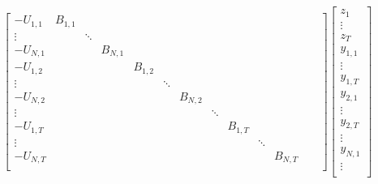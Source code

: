 \documentclass[11pt]{article} %
\begin{document}
\begin{align}  
    \begin{bmatrix}
        -U_{1,1} & B_{1,1} &         &         &         &         &         &         &         &         &         &         &\\
        \vdots  &         & \ddots  &         &         &         &         &         &         &         &         &         &\\
        -U_{N,1} &         &         & B_{N,1} &         &         &         &         &         &         &         &         &\\
        -U_{1,2} &         &         &         & B_{1,2} &         &         &         &         &         &         &         &\\
        \vdots  &         &         &         &          &  \ddots &        &         &         &         &         &         &\\
        -U_{N,2}&         &         &         &         &         & B_{N,2}  &        &         &         &         &         &\\
        \vdots  &         &         &         &         &         &         & \ddots  &         &         &         &         &\\
        -U_{1,T}&         &         &         &         &         &         &         & B_{1,T} &         &          &         &\\
        \vdots  &         &         &         &         &         &         &         &         & \ddots  &         &     &\\
        -U_{N,T}&         &         &         &         &         &         &         &         &         & B_{N,T}  &         & \\
    \end{bmatrix}
    \begin{bmatrix}
        z_{1}\\
        \vdots\\
        z_{T}\\
        y_{1,1}\\
        \vdots \\
        y_{1,T} \\
        y_{2,1}\\
        \vdots \\
        y_{2,T} \\
        \vdots \\
        y_{N,1}\\
        \vdots \\

\end{bmatrix}
\end{align}
\end{document}
